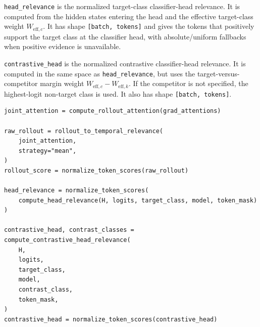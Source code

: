 \documentclass[11pt]{article}
\begin{document}
\texttt{head\_relevance} is the normalized target-class classifier-head
  relevance. It is computed from the hidden states entering the head and the
  effective target-class weight $W_{\mathrm{eff},c}$. It has shape
  \texttt{[batch, tokens]} and gives the tokens that positively support the
  target class at the classifier head, with absolute/uniform fallbacks when
  positive evidence is unavailable.

\texttt{contrastive\_head} is the normalized contrastive classifier-head
  relevance. It is computed in the same space as \texttt{head\_relevance}, but
  uses the target-versus-competitor margin weight
  $W_{\mathrm{eff},c} - W_{\mathrm{eff},k}$. If the competitor is not specified,
  the highest-logit non-target class is used. It also has shape
  \texttt{[batch, tokens]}.

\begin{verbatim}
joint_attention = compute_rollout_attention(grad_attentions)

raw_rollout = rollout_to_temporal_relevance(
    joint_attention,
    strategy="mean",
)
rollout_score = normalize_token_scores(raw_rollout)

head_relevance = normalize_token_scores(
    compute_head_relevance(H, logits, target_class, model, token_mask)
)

contrastive_head, contrast_classes = compute_contrastive_head_relevance(
    H,
    logits,
    target_class,
    model,
    contrast_class,
    token_mask,
)
contrastive_head = normalize_token_scores(contrastive_head)
\end{verbatim}
\end{document}
